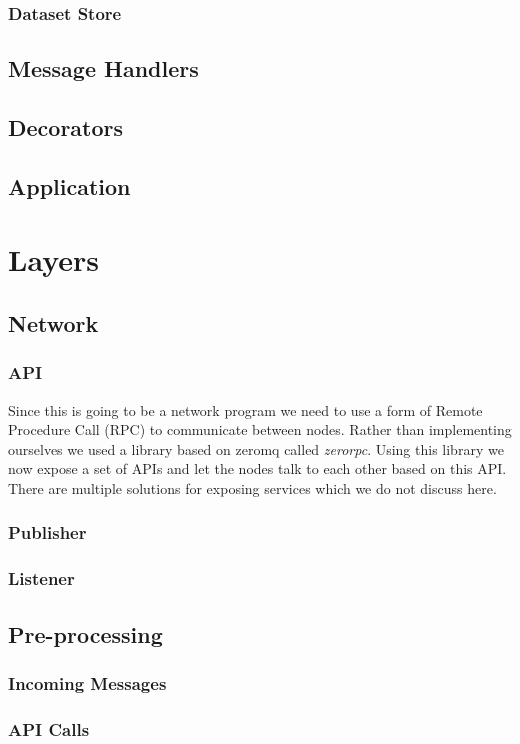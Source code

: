 \subsubsection{Dataset Store}
\subsection{Message Handlers}
\subsection{Decorators}
\subsection{Application}

\section{Layers}
\subsection{Network}
\subsubsection{API}
Since this is going to be a network program we need to use a form of Remote Procedure Call (RPC) 
to communicate between nodes. Rather than implementing ourselves we used a library based on zeromq 
called \textit{zerorpc}. Using this library we now expose a set of APIs and let the nodes talk to 
each other based on this API. There are multiple solutions for exposing services which we do not discuss here.
\subsubsection{Publisher}
\subsubsection{Listener}
\subsection{Pre-processing}
\subsubsection{Incoming Messages}
\subsubsection{API Calls}
